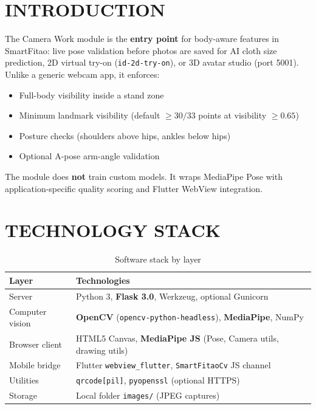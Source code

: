 \documentclass[a4paper,fleqn]{cas-sc}
\newcommand{\tblheadrow}{\rowcolor{tblhead}}
\begin{document}
\maketitle

\section{INTRODUCTION}

The Camera Work module is the \textbf{entry point} for body-aware features in SmartFitao: live pose validation before photos are saved for AI cloth size prediction, 2D virtual try-on (\texttt{id-2d-try-on}), or 3D avatar studio (port 5001). Unlike a generic webcam app, it enforces:

\begin{itemize}
  \item Full-body visibility inside a stand zone
  \item Minimum landmark visibility (default $\geq 30/33$ points at visibility $\geq 0.65$)
  \item Posture checks (shoulders above hips, ankles below hips)
  \item Optional A-pose arm-angle validation
\end{itemize}

The module does \textbf{not} train custom models. It wraps MediaPipe Pose with application-specific quality scoring and Flutter WebView integration.

\section{TECHNOLOGY STACK}

\begin{table}[h]
\centering
\caption{Software stack by layer}
\label{tab:stack}
\begin{tabularx}{\linewidth}{@{}lX@{}}
\tblheadrow
\textbf{Layer} & \textbf{Technologies} \\
\midrule
Server & Python 3, \textbf{Flask 3.0}, Werkzeug, optional Gunicorn \\
Computer vision & \textbf{OpenCV} (\texttt{opencv-python-headless}), \textbf{MediaPipe}, NumPy \\
Browser client & HTML5 Canvas, \textbf{MediaPipe JS} (Pose, Camera utils, drawing utils) \\
Mobile bridge & Flutter \texttt{webview\_flutter}, \texttt{SmartFitaoCv} JS channel \\
Utilities & \texttt{qrcode[pil]}, \texttt{pyopenssl} (optional HTTPS) \\
Storage & Local folder \texttt{images/} (JPEG captures) \\
\end{tabularx}
\end{table}
\end{document}

